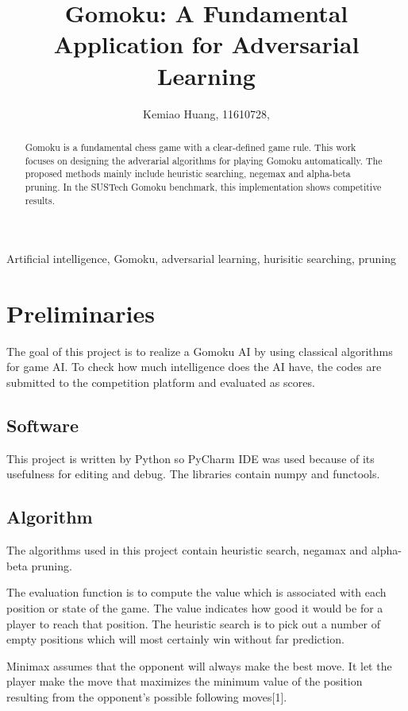 \documentclass[9pt,shortpaper,twoside,web]{ieeecolor}
\begin{document}
\title{\bigskip\bigskip Gomoku: A Fundamental Application for Adversarial Learning}
\author{Kemiao Huang, 11610728, }
\maketitle

\begin{abstract}
Gomoku is a fundamental chess game with a clear-defined game rule. This work focuses on designing the adverarial algorithms for playing Gomoku automatically. The proposed methods mainly include heuristic searching, negemax and alpha-beta pruning. In the SUSTech Gomoku benchmark, this implementation shows competitive results.
\end{abstract}

\begin{IEEEkeywords}
Artificial intelligence, Gomoku, adversarial learning, hurisitic searching, pruning
\end{IEEEkeywords}


\section{Preliminaries}
The goal of this project is to realize a Gomoku AI by using classical algorithms for game AI. To check how much intelligence does the AI have, the codes are submitted to the competition platform and evaluated as scores.
\subsection{Software}
This project is written by Python so PyCharm IDE was used because of its usefulness for editing and debug. The libraries contain numpy and functools.
\subsection{Algorithm}
The algorithms used in this project contain heuristic search, negamax and alpha-beta pruning.  

The evaluation function is to compute the value which is associated with each position or state of the game. The value indicates how good it would be for a player to reach that position. The heuristic search is to pick out a number of empty positions which will most certainly win without far prediction. 

Minimax assumes that the opponent will always make the best move. It let the player make the move that maximizes the minimum value of the position resulting from the opponent's possible following moves[1]. 
\end{document}
